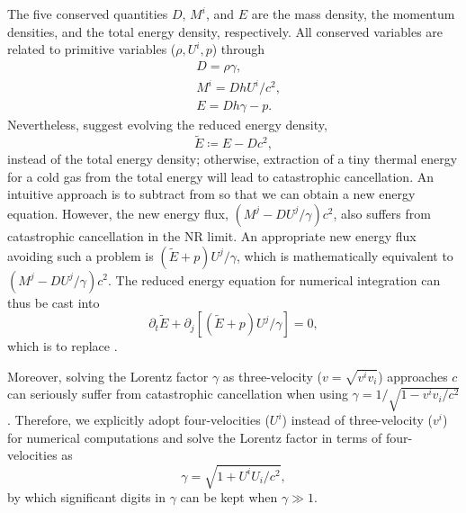 \documentclass[twocolumn]{aastex63}
\begin{document}
The five conserved quantities $D$, $M^{i}$, and $E$ are the mass density, the momentum densities, and the total energy density, respectively. All conserved variables are related to primitive variables ($\rho, U^{i}, p$) through
\begin{subequations}
  \begin{align}
    &D=\rho\gamma,\label{density}\\
    &M^{i}=Dh U^{i} /c^2,\label{momentum}\\
    &E=D h\gamma-p. \label{definition of reduced energy}
  \end{align}
  \label{relation between prim and cons}
\end{subequations}
Nevertheless, \cite{NR_Limit} suggest evolving the reduced energy density,
\begin{equation}
\tilde{E} \coloneqq E-Dc^2, \label{ETilde}
\end{equation}
instead of the total energy density; otherwise, extraction of a tiny thermal energy for a cold gas from the total energy will lead to catastrophic cancellation. An intuitive approach is to subtract  from  so that we can obtain a new energy equation. However, the new energy flux, $\left(M^{j}-DU^{j}/\gamma\right)c^2$, also suffers from catastrophic cancellation in the NR limit. An appropriate new energy flux avoiding such a problem is $(\tilde{E}+p)U^{j}/\gamma$, which is mathematically equivalent to $\left(M^{j}-DU^{j}/\gamma\right)c^2$. The reduced energy equation for numerical integration can thus be cast into
\begin{equation}
    \partial_t \tilde{E}+\partial_j \left[\left(\tilde{E}+p\right)U^{j}/\gamma\right]=0,
    \label{ETilde evolution}
\end{equation}
which is to replace .


Moreover, solving the Lorentz factor $\gamma$ as three-velocity ($v=\sqrt{v^{i}v_{i}}$) approaches $c$ can seriously suffer from catastrophic cancellation when using $\gamma=1/\sqrt{1-v^{i}v_{i}/c^2}$. Therefore, we explicitly adopt four-velocities ($U^{i}$) instead of three-velocity ($v^{i}$) for numerical computations and solve the Lorentz factor in terms of four-velocities as
\begin{equation}
\label{eq:new expression of Lorentz factor}
\gamma=\sqrt{1+U^iU_i/c^2},
\end{equation}
by which significant digits in $\gamma$ can be kept when $\gamma \gg 1$.
\end{document}
